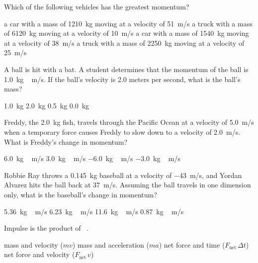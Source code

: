 \documentclass[]{exam}
\begin{document}
\begin{questions}
\question
Which of the following vehicles has the greatest momentum?

\begin{randomizechoices}
\correctchoice a car with a mass of \SI{1210}{kg} moving at a velocity of \SI{51}{m/s}
\choice a truck with a mass of \SI{6120}{kg} moving at a velocity of \SI{10}{m/s}
\choice a car with a mass of \SI{1540}{kg} moving at a velocity of \SI{38}{m/s}
\choice a truck with a mass of \SI{2250}{kg} moving at a velocity of \SI{25}{m/s}
\end{randomizechoices}

\question
A ball is hit with a bat. A student determines that the momentum of the ball is \SI{1.0}{kg\,m/s}. If the ball's velocity is 2.0 meters per second, what is the ball's mass?

\begin{randomizechoices}
\choice \SI{1.0}{kg}
\choice \SI{2.0}{kg}
\correctchoice \SI{0.5}{kg}
\choice \SI{0.0}{kg}
\end{randomizechoices}

\question
Freddy, the \SI{2.0}{kg} fish, travels through the Pacific Ocean at a velocity of \SI{5.0}{m/s} when a temporary force causes Freddy to slow down to a velocity of \SI{2.0}{m/s}. What is Freddy's change in momentum?

\begin{randomizechoices}
\choice \SI{6.0}{kg\,m/s}
\choice \SI{3.0}{kg\,m/s}
\correctchoice \SI{-6.0}{kg\,m/s}
\choice \SI{-3.0}{kg\,m/s}
\end{randomizechoices}

\question
Robbie Ray throws a \SI{0.145}{kg} baseball at a velocity of \SI{-43}{m/s}, and Yordan Alvarez hits the ball back at \SI{37}{m/s}. Assuming the ball travels in one dimension only, what is the baseball's change in momentum?

\begin{randomizechoices}
\choice \SI{5.36}{kg\,m/s}
\choice \SI{6.23}{kg\,m/s}
\correctchoice \SI{11.6}{kg\,m/s}
\choice \SI{0.87}{kg\,m/s}
\end{randomizechoices}

\question
Impulse is the product of \fillin\ .

\begin{randomizechoices}
\choice mass and velocity ($mv$)
\choice mass and acceleration ($ma$)
\correctchoice net force and time ($F_{\text{net}}\,\Delta t$)
\choice net force and velocity ($F_{\text{net}}\,v$)
\end{randomizechoices}


\end{questions}
\end{document}
